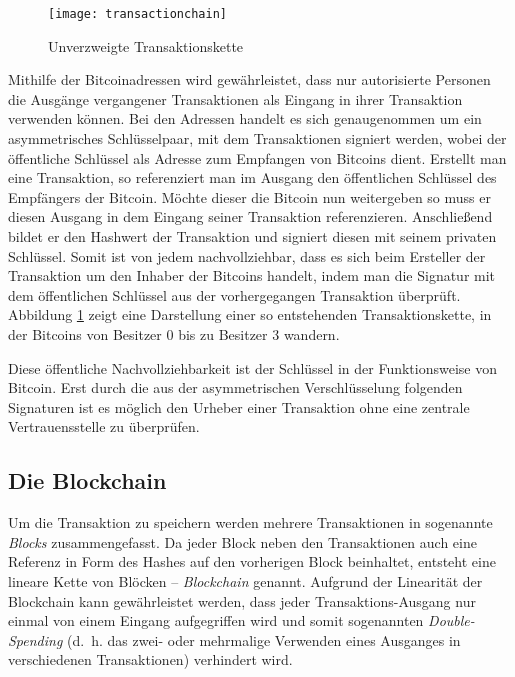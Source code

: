 \begin{figure}
    \begin{center}
        \texttt{[image: transactionchain]}
    	\caption{Unverzweigte Transaktionskette \parencite[2]{nakamoto}}
    	\label{fig:transactionchain}
    \end{center}
\end{figure}

Mithilfe der Bitcoinadressen wird gewährleistet, dass nur autorisierte Personen die Ausgänge vergangener Transaktionen als Eingang in ihrer Transaktion verwenden können.
Bei den Adressen handelt es sich genaugenommen um ein asymmetrisches Schlüsselpaar, mit dem Transaktionen signiert werden, wobei der öffentliche Schlüssel als Adresse zum Empfangen von Bitcoins dient.
Erstellt man eine Transaktion, so referenziert man im Ausgang den öffentlichen Schlüssel des Empfängers der Bitcoin.
Möchte dieser die Bitcoin nun weitergeben so muss er diesen Ausgang in dem Eingang seiner Transaktion referenzieren.
Anschließend bildet er den Hashwert der Transaktion und signiert diesen mit seinem privaten Schlüssel.
Somit ist von jedem nachvollziehbar, dass es sich beim Ersteller der Transaktion um den Inhaber der Bitcoins handelt, indem man die Signatur mit dem öffentlichen Schlüssel aus der vorhergegangen Transaktion überprüft.
Abbildung \ref{fig:transactionchain} zeigt eine Darstellung einer so entstehenden Transaktionskette, in der Bitcoins von Besitzer 0 bis zu Besitzer 3 wandern.

Diese öffentliche Nachvollziehbarkeit ist der Schlüssel in der Funktionsweise von Bitcoin.
Erst durch die aus der asymmetrischen Verschlüsselung folgenden Signaturen ist es möglich den Urheber einer Transaktion ohne eine zentrale Vertrauensstelle zu überprüfen.

\subsection{Die Blockchain}

Um die Transaktion zu speichern werden mehrere Transaktionen in sogenannte \emph{Blocks} zusammengefasst.
Da jeder Block neben den Transaktionen auch eine Referenz in Form des Hashes auf den vorherigen Block beinhaltet, entsteht eine lineare Kette von Blöcken -- \emph{Blockchain} genannt.
Aufgrund der Linearität der Blockchain kann gewährleistet werden, dass jeder Transaktions-Ausgang nur einmal von einem Eingang aufgegriffen wird und somit sogenannten \emph{Double-Spending} (d.~h. das zwei- oder mehrmalige Verwenden eines Ausganges in verschiedenen Transaktionen) verhindert wird.

